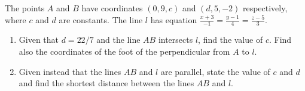 \begin{problem}
    The points $A$ and $B$ have coordinates $(0, 9, c)$ and $(d, 5, -2)$ respectively, where $c$ and $d$ are constants. The line $l$ has equation $\frac{x+3}{-1} = \frac{y-1}4 = \frac{z-5}3$.

    \begin{enumerate}
        \item Given that $d = 22/7$ and the line $AB$ intersects $l$, find the value of $c$. Find also the coordinates of the foot of the perpendicular from $A$ to $l$.
        \item Given instead that the lines $AB$ and $l$ are parallel, state the value of $c$ and $d$ and find the shortest distance between the lines $AB$ and $l$.
    \end{enumerate}
\end{problem}
